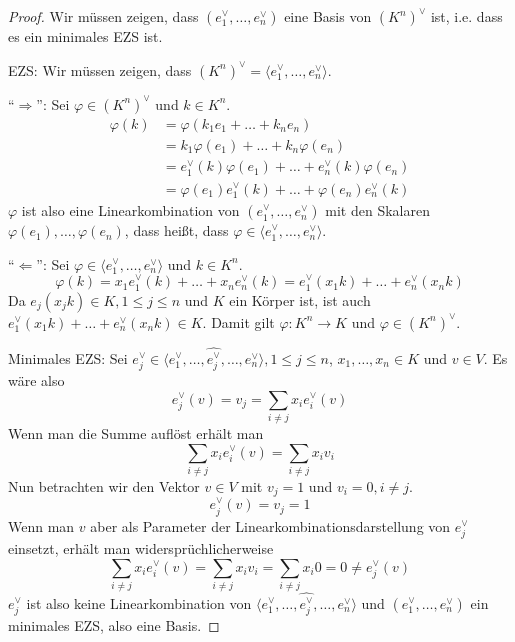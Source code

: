 \documentclass[a4paper,10pt]{article}
\begin{document}
\begin{proof}
 Wir müssen zeigen, dass $(e_1^\vee, \dots, e_n^\vee)$ eine Basis von $(K^n)^\vee$ ist, i.e. dass es ein minimales EZS ist.

 EZS: Wir müssen zeigen, dass $(K^n)^\vee = \langle e_1^\vee, \dots, e_n^\vee \rangle$.
 
 ``$\Rightarrow$'': Sei $\varphi \in (K^n)^\vee$ und $k \in K^n$.
 \begin{align}
  \varphi(k) & = \varphi(k_1e_1 + \dots + k_ne_n)\\
  & = k_1\varphi(e_1) + \dots + k_n\varphi(e_n)\\
  & = e_1^\vee(k)\varphi(e_1) + \dots + e_n^\vee(k)\varphi(e_n)\\
  & = \varphi(e_1)e_1^\vee(k) + \dots + \varphi(e_n)e_n^\vee(k)
 \end{align}
 $\varphi$ ist also eine Linearkombination von $(e_1^\vee, \dots, e_n^\vee)$ mit den Skalaren $\varphi(e_1), \dots, \varphi(e_n)$, dass heißt, dass $\varphi \in \langle e_1^\vee, \dots, e_n^\vee \rangle$.
 
 ``$\Leftarrow$'': Sei $\varphi \in \langle e_1^\vee, \dots, e_n^\vee \rangle$ und $k \in K^n$.
 \begin{equation}
  \varphi(k) = x_1e_1^\vee(k) + \dots + x_ne_n^\vee(k) = e_1^\vee(x_1k) + \dots + e_n^\vee(x_nk)
 \end{equation}
 Da $e_j(x_jk) \in K, 1 \le j \le n$ und $K$ ein Körper ist, ist auch $e_1^\vee(x_1k) + \dots + e_n^\vee(x_nk) \in K$.
 Damit gilt $\varphi: K^n \rightarrow K$ und $\varphi \in (K^n)^\vee$.
 
 Minimales EZS: Sei $e_j^\vee \in \langle e_1^\vee, \dots, \widehat{e_j^\vee}, \dots, e_n^\vee \rangle, 1 \le j \le n$, $x_1, \dots, x_n \in K$ und $v \in V$.
 Es wäre also
 \begin{equation}
  e_j^\vee(v) = v_j = \sum_{i \ne j} x_ie_i^\vee(v)
 \end{equation}
 Wenn man die Summe auflöst erhält man
 \begin{equation}
  \sum_{i \ne j} x_ie_i^\vee(v) = \sum_{i \ne j} x_iv_i
 \end{equation}
 Nun betrachten wir den Vektor $v \in V$ mit $v_j = 1$ und $v_i = 0, i \ne j$.
 \begin{equation}
  e_j^\vee(v) = v_j = 1
 \end{equation}
 Wenn man $v$ aber als Parameter der Linearkombinationsdarstellung von $e_j^\vee$ einsetzt, erhält man widersprüchlicherweise
 \begin{equation}
  \sum_{i \ne j} x_ie_i^\vee(v) = \sum_{i \ne j} x_iv_i = \sum_{i \ne j} x_i0 = 0 \ne e_j^\vee(v)
 \end{equation}
 $e_j^\vee$ ist also keine Linearkombination von $\langle e_1^\vee, \dots, \widehat{e_j^\vee}, \dots, e_n^\vee \rangle$ und $(e_1^\vee, \dots, e_n^\vee)$ ein minimales EZS, also eine Basis.
\end{proof}
\end{document}
